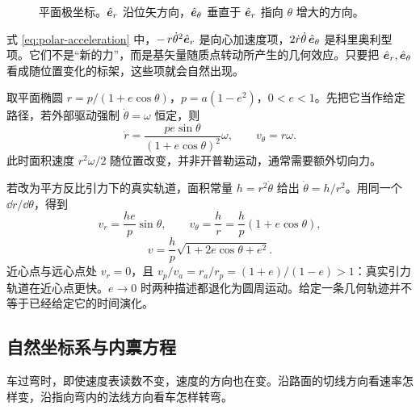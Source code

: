 \begin{figure}[htbp]
\centering
{}
\caption{平面极坐标。$\hat{\boldsymbol{e}}_r$ 沿位矢方向，$\hat{\boldsymbol{e}}_\theta$ 垂直于 $\hat{\boldsymbol{e}}_r$ 指向 $\theta$ 增大的方向。}
\label{fig:polar}
\end{figure}

\begin{physicsbox}
式 \eqref{eq:polar-acceleration} 中，$-\,r\dot\theta^2\hat{\boldsymbol{e}}_r$ 是向心加速度项，$2\dot r\dot\theta\,\hat{\boldsymbol{e}}_\theta$ 是科里奥利型项。它们不是“新的力”，而是基矢量随质点转动所产生的几何效应。只要把 $\hat{\boldsymbol{e}}_r,\hat{\boldsymbol{e}}_\theta$ 看成随位置变化的标架，这些项就会自然出现。
\end{physicsbox}

\begin{example}
取平面椭圆 $r=p/(1+e\cos\theta)$，$p=a(1-e^2)$，$0<e<1$。先把它当作给定路径，若外部驱动强制 $\dot\theta=\omega$ 恒定，则
\[
\dot r=\frac{pe\sin\theta}{(1+e\cos\theta)^2}\omega,
\qquad v_\theta=r\omega.
\]
此时面积速度 $r^2\omega/2$ 随位置改变，并非开普勒运动，通常需要额外切向力。

若改为平方反比引力下的真实轨道，面积常量 $h=r^2\dot\theta$ 给出 $\dot\theta=h/r^2$。用同一个 $\dd r/\dd\theta$，得到
\[
v_r=\frac{he}{p}\sin\theta,\qquad
v_\theta=\frac{h}{r}=\frac{h}{p}(1+e\cos\theta),
\]
\[
v=\frac{h}{p}\sqrt{1+2e\cos\theta+e^2}.
\]
近心点与远心点处 $v_r=0$，且 $v_p/v_a=r_a/r_p=(1+e)/(1-e)>1$：真实引力轨道在近心点更快。$e\to0$ 时两种描述都退化为圆周运动。给定一条几何轨迹并不等于已经给定它的时间演化。
\end{example}

\subsection{自然坐标系与内禀方程}

车过弯时，即使速度表读数不变，速度的方向也在变。沿路面的切线方向看速率怎样变，沿指向弯内的法线方向看车怎样转弯。

